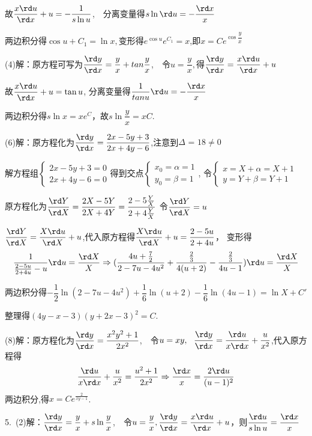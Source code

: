   故$\dfrac{x\rd u}{\rd x}+u=-\dfrac{1}{s \ln u}$,~~分离变量得$s \ln \rd u=-\dfrac{\rd x}{x}$

  两边积分得$\cos u+C_1= \ln x,$变形得$e^{\cos u}e^{C_1}=x$,即$x=Ce^{\cos\dfrac{y}{x}} $

  (4)解：原方程可写为$\dfrac{\rd y}{\rd x}=\dfrac{y}{x}+tan\dfrac{y}{x}$,~~令$u=\dfrac{y}{x},$得$\dfrac{\rd y}{\rd x}=\dfrac{x\rd u}{\rd x}+u$

  故$\dfrac{x\rd u}{\rd x}+u=\tan u$, 分离变量得$\dfrac{1}{tanu}\rd u=-\dfrac{\rd x}{x}$

  两边积分得$s \ln x=xe^C$，故$s \ln \dfrac{y}{x}=xC$.

  (6)解：原方程化为$\dfrac{\rd y}{\rd x}=\dfrac{2x-5y+3}{2x+4y-6}$,注意到$\Delta {\text{ = 18}} \ne {\text{0}}$

  解方程组$\begin{cases}2x-5y+3=0\\2x+4y-6=0\end{cases}$得到交点$\begin{cases}x_0=\alpha=1\\y_0=\beta=1\end{cases}$, 令$\begin{cases}x=X+\alpha=X+1\\y=Y+\beta=Y+1\end{cases}$

  原方程化为$\dfrac{\rd Y}{\rd X}=\dfrac{2X-5Y}{2X+4Y}=\dfrac{2-5\frac{Y}{X}}{2+4\frac{Y}{X}}$
  令$\dfrac{\rd Y}{\rd X}=u$

  $\dfrac{\rd Y}{\rd X}=\dfrac{X\rd u}{\rd X}+u$,代入原方程得$\dfrac{X\rd u}{\rd X}+u=\dfrac{2-5u}{2+4u}$，
  变形得$$\dfrac{1}{\frac{2-5u}{2+4u}-u}\rd u=\dfrac{\rd X}{X} \Rightarrow (\dfrac{4u+\frac{7}{2}}{2-7u-4u^2}+\dfrac{\frac{2}{3}}{4(u+2)}-\dfrac{\frac{2}{3}}{4u-1})\rd u=\dfrac{\rd X}{X}$$

  两边积分得$-\dfrac{1}{2} \ln (2-7u-4u^2)+\dfrac{1}{6} \ln (u+2)-\dfrac{1}{6} \ln (4u-1)= \ln X+C'$

  整理得$(4y-x-3)(y+2x-3)^2=C$.

  (8)解：原方程化为$\dfrac{\rd y}{\rd x}=\dfrac{x^2y^2+1}{2x^2}$,~~令$u=xy,~~\dfrac{\rd y}{\rd x}=\dfrac{\rd u}{x\rd x}+\dfrac{u}{x^2}$,代入原方程得
  $$\dfrac{\rd u}{x\rd x}+\dfrac{u}{x^2}=\dfrac{u^2+1}{2x^2} \Rightarrow \dfrac{\rd x}{x}=\dfrac{2\rd u}{(u-1)^2}$$
  两边积分,得$x=Ce^{\frac{2}{xy-1}}$.

  5.~(2)解：$\dfrac{\rd y}{\rd x}=\dfrac{y}{x}+s \ln \dfrac{y}{x}$,~~令$u=\dfrac{y}{x},\dfrac{\rd y}{\rd x}=\dfrac{x\rd u}{\rd x}+u$，则$\dfrac{\rd u}{s \ln u}=\dfrac{\rd x}{x}$

